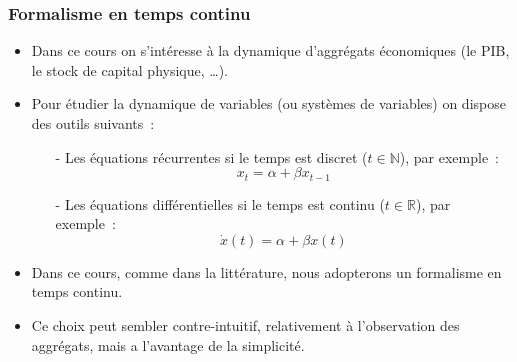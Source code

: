 \documentclass[10pt,notheorems]{beamer}
\theoremstyle{plain}
\theoremstyle{definition} %
\begin{document}
\begin{frame}
  \frametitle{Formalisme en temps continu}

  \begin{itemize}

  \item Dans ce cours on s'intéresse à la dynamique d'aggrégats économiques (le PIB, le stock de capital physique, \ldots).\newline

  \item Pour étudier la dynamique de variables (ou systèmes de variables) on dispose des outils suivants~:

    \begin{itemize}

    \item[-] Les équations récurrentes si le temps est discret ($t\in\mathbb N$), par exemple~:
      \[
        x_t = \alpha + \beta x_{t-1}
      \]

    \item[-] Les équations différentielles si le temps est continu ($t\in\mathbb R$), par exemple~:
      \[
        \dot x(t) = \alpha + \beta x(t)
      \]
    \end{itemize}

    \medskip

  \item Dans ce cours, comme dans la littérature, nous adopterons un
    formalisme en temps continu.\newline

  \item Ce choix peut sembler contre-intuitif, relativement à
    l'observation des aggrégats, mais a l'avantage de la simplicité.

  \end{itemize}

\end{frame}
\end{document}

